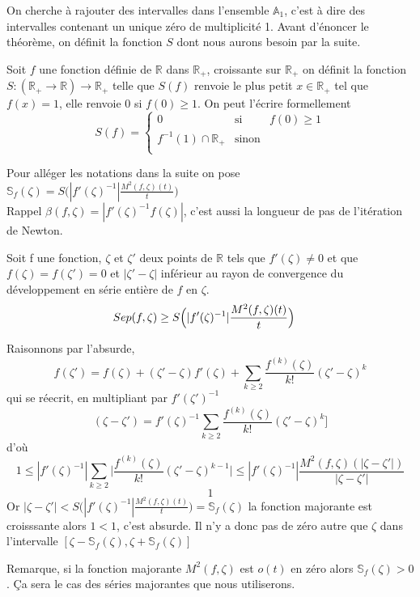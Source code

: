 \documentclass[a4paper,10.5pt]{article}
\begin{document}
	\noindent On cherche à rajouter des intervalles dans l'ensemble $\mathbb{A}_1$, c'est à dire des intervalles contenant un unique zéro de multiplicité 1.
	Avant d'énoncer le théorème, on définit la fonction $S$ dont nous aurons besoin par la suite. 
	\begin{definition} Soit $f$ une fonction définie de $\mathbb{R}$ dans $\mathbb{R}_+$, croissante sur $\mathbb{R}_+$ on définit la fonction $S:(\mathbb{R}_+ \rightarrow \mathbb{R}) \longrightarrow \mathbb{R}_+$  telle que $S(f)$ renvoie le plus petit $x \in \mathbb{R}_+$ tel que $f(x)=1$, elle renvoie 0 si $f(0) \geq1$. On  peut l'écrire formellement
		\begin{equation}
		S(f)=
		\left\lbrace
		\begin{array}{ccc}
		0  & \mbox{si} & f(0) \geq 1\\
		f^{-1}(1)\cap \mathbb{R}_{+} & \mbox{sinon}\\
		\end{array}\right.
		\end{equation}
	\end{definition}
	\vspace{7mm}
	Pour alléger les notations dans la suite on pose $\mathbb{S}_{f}(\zeta)=S\Big(|f'(\zeta)^{-1}|\frac{M^{2}(f,\zeta)(t)}{t}\Big)$\\
	Rappel $\beta(f,\zeta)=|f'(\zeta)^{-1}f(\zeta)|$, c'est aussi la longueur de pas de l'itération de Newton.
	\vspace{7mm}
	\begin{theorem}	Soit f une fonction, $\zeta$ et $\zeta '$ deux points de $\mathbb{R}$ tels que $f'(\zeta)\neq 0$ et que $f(\zeta)=f(\zeta ')=0$ et $|\zeta '-\zeta|$ inférieur au rayon de convergence du développement en série entière de $f$ en $\zeta$. 
		\[Sep(f,\zeta) \geq S\Big(|f'(\zeta)^{-1}|\frac{M^{2}(f,\zeta)(t)}{t}\Big) \hspace{4mm} \]
	\end{theorem}

	\begin{demonstration}Raisonnons par l'absurde, 
	\[f(\zeta ')=f(\zeta)+(\zeta '-\zeta)f'(\zeta)+ \sum_{k \geq 2}\frac{f^{(k)}(\zeta)}{k!}(\zeta'-\zeta)^k\]
	qui se réecrit, en multipliant par $f'(\zeta ')^{-1}$
	\[(\zeta-\zeta')=f'(\zeta)^{-1} \sum_{k \geq 2}\frac{f^{(k)}(\zeta)}{k!}(\zeta'-\zeta)^k]\]
	d'où 
	\[1 \leq |f'(\zeta)^{-1}|\sum_{k \geq 2}  \big|\frac{f^{(k)}(\zeta)}{k!}(\zeta'-\zeta)^{k-1} \big|\leq |f'(\zeta)^{-1}| \frac{M^{2}(f,\zeta)(|\zeta-\zeta'|)}{|\zeta-\zeta'|}\]
	\[1 \]
	Or $|\zeta-\zeta'|<S\Big(|f'(\zeta)^{-1}|\frac{M^{2}(f,\zeta)(t)}{t}\Big)=\mathbb{S}_{f}(\zeta)$ la fonction majorante est croisssante alors $1<1$, c'est absurde. Il n'y a donc  pas de zéro autre que $\zeta$  dans l'intervalle $[\zeta-\mathbb{S}_{f}(\zeta),\zeta+\mathbb{S}_{f}(\zeta)]$
	\end{demonstration} 
	\noindent Remarque, si la fonction majorante $M^{2}(f,\zeta)$ est $o(t)$ en zéro alors $\mathbb{S}_{f}(\zeta)>0$. Ça sera le cas des séries majorantes que nous utiliserons.
\end{document}
